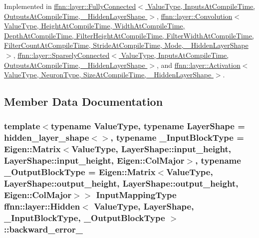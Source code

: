 Implemented in \hyperlink{classffnn_1_1layer_1_1_fully_connected_a7dd4dbe010c3d290c131b21b35f6301e}{ffnn\-::layer\-::\-Fully\-Connected$<$ Value\-Type, Inputs\-At\-Compile\-Time, Outputs\-At\-Compile\-Time, \-\_\-\-Hidden\-Layer\-Shape $>$}, \hyperlink{classffnn_1_1layer_1_1_convolution_aa56059e379a152efee3de409a217d1e1}{ffnn\-::layer\-::\-Convolution$<$ Value\-Type, Height\-At\-Compile\-Time, Width\-At\-Compile\-Time, Depth\-At\-Compile\-Time, Filter\-Height\-At\-Compile\-Time, Filter\-Width\-At\-Compile\-Time, Filter\-Count\-At\-Compile\-Time, Stride\-At\-Compile\-Time, Mode, \-\_\-\-Hidden\-Layer\-Shape $>$}, \hyperlink{classffnn_1_1layer_1_1_sparsely_connected_afa564d528e74917231da2d038f76e3f1}{ffnn\-::layer\-::\-Sparsely\-Connected$<$ Value\-Type, Inputs\-At\-Compile\-Time, Outputs\-At\-Compile\-Time, \-\_\-\-Hidden\-Layer\-Shape $>$}, and \hyperlink{classffnn_1_1layer_1_1_activation_a24a044458729f72466af06153851f5b2}{ffnn\-::layer\-::\-Activation$<$ Value\-Type, Neuron\-Type, Size\-At\-Compile\-Time, \-\_\-\-Hidden\-Layer\-Shape $>$}.



\subsection{Member Data Documentation}
\hypertarget{classffnn_1_1layer_1_1_hidden_a94312439d5029c9c779ff778f18f95a8}{
\subsubsection[{backward\-\_\-error\-\_\-}]{\setlength{\rightskip}{0pt plus 5cm}template$<$typename Value\-Type, typename Layer\-Shape = hidden\-\_\-layer\-\_\-shape$<$$>$, typename \-\_\-\-Input\-Block\-Type = Eigen\-::\-Matrix$<$\-Value\-Type, Layer\-Shape\-::input\-\_\-height, Layer\-Shape\-::input\-\_\-height, Eigen\-::\-Col\-Major$>$, typename \-\_\-\-Output\-Block\-Type = Eigen\-::\-Matrix$<$\-Value\-Type, Layer\-Shape\-::output\-\_\-height, Layer\-Shape\-::output\-\_\-height, Eigen\-::\-Col\-Major$>$$>$ {\bf Input\-Mapping\-Type} {\bf ffnn\-::layer\-::\-Hidden}$<$ Value\-Type, Layer\-Shape, \-\_\-\-Input\-Block\-Type, \-\_\-\-Output\-Block\-Type $>$\-::backward\-\_\-error\-\_\-\hspace{0.3cm}{\ttfamily [protected]}}}\label{classffnn_1_1layer_1_1_hidden_a94312439d5029c9c779ff778f18f95a8}


